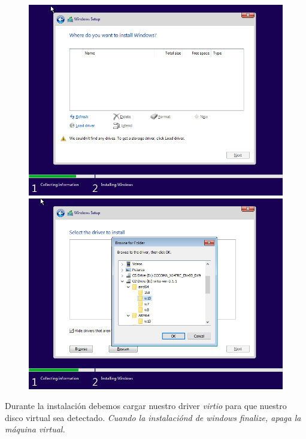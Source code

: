 \documentclass[11pt]{article}
\begin{document}
\begin{figure}[h!]
	\centering
	\begin{minipage}[b]{0.4965\textwidth}
		\includegraphics[width=\textwidth]{images/windows-setup-01.png}
	\end{minipage}
	\begin{minipage}[b]{0.4965\textwidth}
		\includegraphics[width=\textwidth]{images/windows-setup-02.png}
	\end{minipage}
\end{figure}

Durante la instalación debemos cargar nuestro driver \emph{virtio} para que nuestro disco virtual sea detectado. \emph{Cuando la instalaciónd de windows finalize, apaga la máquina virtual.}
\end{document}
